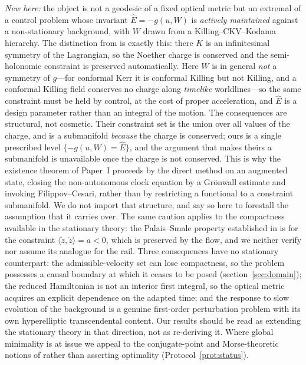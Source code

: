 \documentclass[12pt]{iopart}
\theoremstyle{plain}
\theoremstyle{definition}
\theoremstyle{remark}
\newcommand{\Ehat}{\hat E}
\begin{document}
\emph{New here:} the object is not a geodesic of a fixed optical metric but an extremal of
a control problem whose invariant $\Ehat=-g(u,W)$ is \emph{actively maintained} against a
non-stationary background, with $W$ drawn from a Killing--CKV--Kodama hierarchy. The
distinction from \cite{CaponioCoronaGiamboPiccione2024} is exactly this: there $K$ is an
infinitesimal symmetry of the Lagrangian, so the Noether charge is conserved and the
semi-holonomic constraint is preserved automatically. Here $W$ is in general \emph{not} a
symmetry of $g$---for conformal Kerr it is conformal Killing but not Killing, and a
conformal Killing field conserves no charge along \emph{timelike} worldlines---so the
same constraint must be held by control, at the cost of proper acceleration, and $\Ehat$
is a design parameter rather than an integral of the motion. The consequences are
structural, not cosmetic. Their constraint set is the union over all values of the
charge, and is a submanifold \emph{because} the charge is conserved; ours is a single
prescribed level $\{-g(u,W)=\Ehat\}$, and the argument that makes theirs a submanifold is
unavailable once the charge is not conserved. This is why the existence theorem of
Paper~I proceeds by the direct method on an augmented state, closing the non-autonomous
clock equation by a Gr\"onwall estimate and invoking Filippov--Cesari, rather than by
restricting a functional to a constraint submanifold. We do not import that structure,
and say so here to forestall the assumption that it carries over. The same caution
applies to the compactness available in the stationary theory: the Palais--Smale property
established in \cite{GiannoniMasielloPiccione1998} is for the constraint
$\langle\dot z,\dot z\rangle=a<0$, which is preserved by the flow, and we neither verify
nor assume its analogue for the rail.
Three
consequences have no stationary counterpart: the admissible-velocity set can lose
compactness, so the problem possesses a causal boundary at which it ceases to be posed
(section~\ref{sec:domain}); the reduced Hamiltonian is not an interior first integral, so
the optical metric acquires an explicit dependence on the adapted time; and the response to
slow evolution of the background is a genuine first-order perturbation problem with its own
hyperelliptic transcendental content. Our results should be read as extending the
stationary theory in that direction, not as re-deriving it. Where global minimality is at
issue we appeal to the conjugate-point and Morse-theoretic notions of
\cite{GiannoniPiccioneTausk2002,GiannoniPiccione2002} rather than asserting
optimality (Protocol~\ref{prot:status}).
\end{document}

